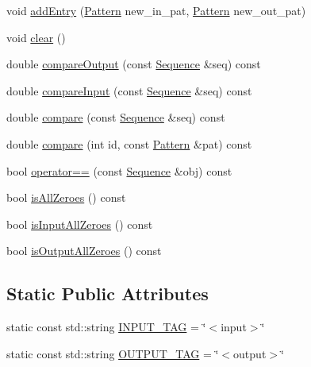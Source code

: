 \begin{DoxyCompactItemize}
\item 
void \hyperlink{classcryomesh_1_1state_1_1Sequence_a5d1cbd5444170cb49adb673638b89d3d}{add\-Entry} (\hyperlink{classcryomesh_1_1state_1_1Pattern}{\-Pattern} new\-\_\-in\-\_\-pat, \hyperlink{classcryomesh_1_1state_1_1Pattern}{\-Pattern} new\-\_\-out\-\_\-pat)
\item 
void \hyperlink{classcryomesh_1_1state_1_1Sequence_a8cc685c6a80ba72ea4bad59c9204028b}{clear} ()
\item 
double \hyperlink{classcryomesh_1_1state_1_1Sequence_ac59edc0fd6710419bab718444a3ba5bb}{compare\-Output} (const \hyperlink{classcryomesh_1_1state_1_1Sequence}{\-Sequence} \&seq) const 
\item 
double \hyperlink{classcryomesh_1_1state_1_1Sequence_a6f7579757532eb6f79ec83a710ccce00}{compare\-Input} (const \hyperlink{classcryomesh_1_1state_1_1Sequence}{\-Sequence} \&seq) const 
\item 
double \hyperlink{classcryomesh_1_1state_1_1Sequence_aa4f60345ed363990938e27d072fc4a3d}{compare} (const \hyperlink{classcryomesh_1_1state_1_1Sequence}{\-Sequence} \&seq) const 
\item 
double \hyperlink{classcryomesh_1_1state_1_1Sequence_af3501217285af5c2c733b46587ae68ed}{compare} (int id, const \hyperlink{classcryomesh_1_1state_1_1Pattern}{\-Pattern} \&pat) const 
\item 
bool \hyperlink{classcryomesh_1_1state_1_1Sequence_afcade8ed6ea4e8c0b24a1e41c53314b7}{operator==} (const \hyperlink{classcryomesh_1_1state_1_1Sequence}{\-Sequence} \&obj) const 
\item 
bool \hyperlink{classcryomesh_1_1state_1_1Sequence_a8927abddc8688d1a2de797b894dddb9d}{is\-All\-Zeroes} () const 
\item 
bool \hyperlink{classcryomesh_1_1state_1_1Sequence_adcbb1691370a2122cf00a1ff5954495c}{is\-Input\-All\-Zeroes} () const 
\item 
bool \hyperlink{classcryomesh_1_1state_1_1Sequence_a05fb9b9553b3a7f6fca37f659b8907ea}{is\-Output\-All\-Zeroes} () const 
\end{DoxyCompactItemize}
\subsection*{\-Static \-Public \-Attributes}
\begin{DoxyCompactItemize}
\item 
static const std\-::string \hyperlink{classcryomesh_1_1state_1_1Sequence_ad84c6b3291384cd1db8235d735fa7589}{\-I\-N\-P\-U\-T\-\_\-\-T\-A\-G} = \char`\"{}$<$input$>$\char`\"{}
\item 
static const std\-::string \hyperlink{classcryomesh_1_1state_1_1Sequence_a3aaf7140b264dc19f04080e8b064814f}{\-O\-U\-T\-P\-U\-T\-\_\-\-T\-A\-G} = \char`\"{}$<$output$>$\char`\"{}
\end{DoxyCompactItemize}
